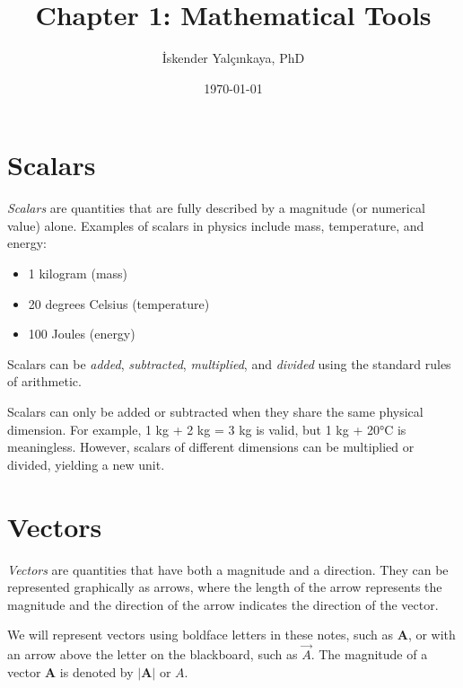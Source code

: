 \documentclass[12pt]{article}
\title{Chapter 1: Mathematical Tools}
\author{İskender Yalçınkaya, PhD}
\date{\today}
\begin{document}
\maketitle
\section{Scalars}
\emph{Scalars} are quantities that are fully described by a magnitude (or numerical value) alone. Examples of scalars in physics include mass, temperature, and energy:
\begin{itemize}
    \item 1 kilogram (mass)
    \item 20 degrees Celsius (temperature)
    \item 100 Joules (energy)
\end{itemize}
 
Scalars can be \emph{added}, \emph{subtracted}, \emph{multiplied}, and \emph{divided} using the standard rules of arithmetic. 

Scalars can only be added or subtracted when they share the same physical dimension. For example, 1 kg + 2 kg = 3 kg is valid, but 1 kg + 20°C is meaningless. However, scalars of different dimensions can be multiplied or divided, yielding a new unit.
\section{Vectors}
\emph{Vectors} are quantities that have both a magnitude and a direction. They can be represented graphically as arrows, where the length of the arrow represents the magnitude and the direction of the arrow indicates the direction of the vector. 

\begin{figure}[h]
\centering
{}
\end{figure}

We will represent vectors using boldface letters in these notes, such as \(\mathbf{A}\), or with an arrow above the letter on the blackboard, such as \(\vec{A}\). The magnitude of a vector \(\mathbf{A}\) is denoted by \(|\mathbf{A}|\) or \(A\).
\end{document}

